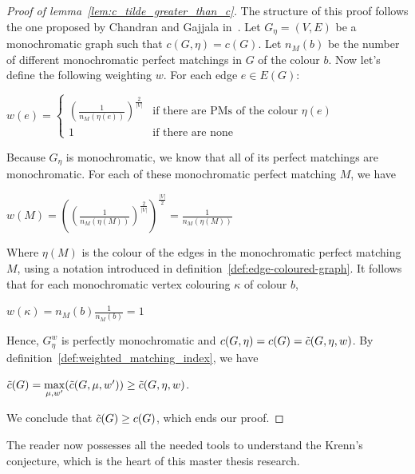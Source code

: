 \begin{proof}[Proof of lemma~\ref{lem:c_tilde_greater_than_c}]
    The structure of this proof follows the one proposed by Chandran and Gajjala in~\cite{chandran}.
    Let $G_\eta = (V, E)$ be a monochromatic graph such that $c(G, \eta) = c(G)$.
    Let $n_{M}(b)$ be the number of different monochromatic perfect matchings in $G$ of the colour $b$.
    Now let's define the following weighting $w$.
    For each edge $e \in E(G)$:
    
    \begin{center}
        $w(e) = \left\{
        \begin{array}{ll}
            \left(\frac{1}{n_{M}(\eta(e))}\right)^{\frac{2}{|V|}} & \mbox{if there are PMs of the colour } \eta(e) \\
            1 & \mbox{if there are none}
        \end{array}
        \right.$
    \end{center}

    Because $G_\eta$ is monochromatic, we know that all of its perfect matchings are monochromatic.
    For each of these monochromatic perfect matching $M$, we have
    
    \begin{center}
        $w(M) = \left( \left(\frac{1}{n_{M}(\eta(M))}\right)^{\frac{2}{|V|}}\right)^{\frac{|V|}{2}} = \frac{1}{n_{M}(\eta(M))}$
    \end{center}

    Where $\eta(M)$ is the colour of the edges in the monochromatic perfect matching $M$, using a notation introduced in definition~\ref{def:edge-coloured-graph}.
    It follows that for each monochromatic vertex colouring $\kappa$ of colour $b$,
    
    \begin{center}
        $w(\kappa) = n_{M}(b)\frac{1}{n_{M}(b)} = 1$
    \end{center}
    
    Hence, $G_\eta^w$ is perfectly monochromatic and $c(G, \eta) = c(G) = \Tilde{c}(G, \eta, w)$.
    By definition~\ref{def:weighted_matching_index}, we have
    \begin{center}
        $\Tilde{c}(G) = \max\limits_{\mu, w'}(\Tilde{c}(G, \mu, w')) \geq \Tilde{c}(G, \eta, w)$.
    \end{center}
    We conclude that $\Tilde{c}(G) \geq c(G)$, which ends our proof.
\end{proof}

The reader now possesses all the needed tools to understand the Krenn's conjecture, which is the heart of this master thesis research.

